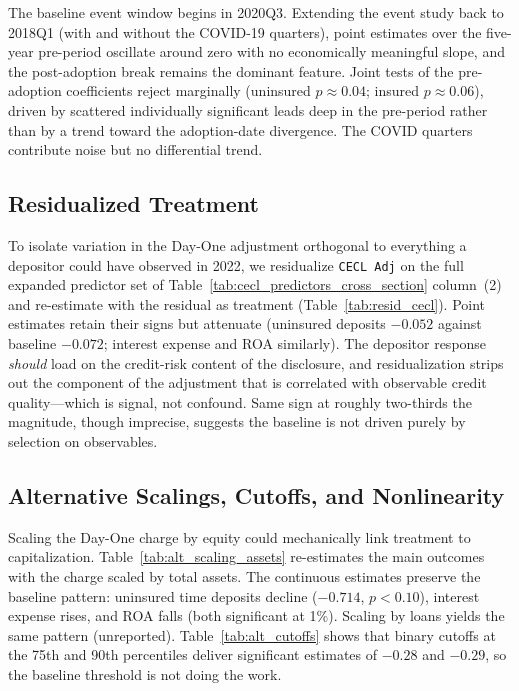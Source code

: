 The baseline event window begins in 2020Q3.  Extending the event study
back to 2018Q1 (with and without the COVID-19 quarters), point estimates
over the five-year pre-period oscillate around zero with no economically
meaningful slope, and the post-adoption break remains the dominant
feature.  Joint tests of the pre-adoption coefficients reject marginally
(uninsured $p \approx 0.04$; insured $p \approx 0.06$), driven by
scattered individually significant leads deep in the pre-period rather
than by a trend toward the adoption-date divergence.  The COVID quarters
contribute noise but no differential trend.

\subsection{Residualized Treatment}
\label{sec:robustness:resid}

To isolate variation in the Day-One adjustment orthogonal to everything a
depositor could have observed in 2022, we residualize \texttt{CECL Adj} on
the full expanded predictor set of
Table~\ref{tab:cecl_predictors_cross_section} column~(2) and re-estimate
with the residual as treatment (Table~\ref{tab:resid_cecl}).  Point
estimates retain their signs but attenuate (uninsured deposits $-0.052$
against baseline $-0.072$; interest expense and ROA similarly).  The
depositor response \emph{should} load on the credit-risk content of the
disclosure, and residualization strips out the component of the adjustment
that is correlated with observable credit quality---which is signal, not
confound.  Same sign at roughly two-thirds the magnitude, though
imprecise, suggests the baseline is not driven purely by selection on
observables.

\subsection{Alternative Scalings, Cutoffs, and Nonlinearity}
\label{sec:robustness:scaling}

Scaling the Day-One charge by equity could mechanically link treatment to
capitalization.  Table~\ref{tab:alt_scaling_assets} re-estimates the main
outcomes with the charge scaled by total assets.  The continuous estimates
preserve the baseline pattern: uninsured time deposits decline
($-0.714$, $p<0.10$), interest expense rises, and ROA falls (both
significant at 1\%).  Scaling by loans yields the same pattern
(unreported).  Table~\ref{tab:alt_cutoffs} shows that binary cutoffs at
the 75th and 90th percentiles deliver significant estimates of $-0.28$
and $-0.29$, so the baseline threshold is not doing the work.

